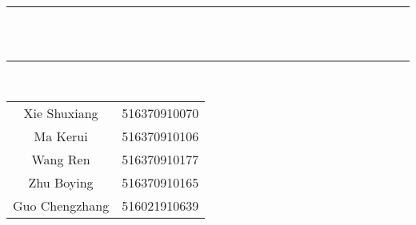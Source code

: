 \vspace*{3em}
\begin{center}
{\rule{11cm}{0.01cm} \\ \tiny~
\\ \large {}
\rule{11cm}{0.01cm}  
\vspace*{3.5em}
\\  \large{}}
\end{center}

\normalsize
\vspace*{10em}
\begin{center}
\begin{tabular}{cl}
\large
\vspace{0.3em} Xie Shuxiang&516370910070\vspace{0.3em}\\ 
\large
Ma Kerui\vspace{0.3em} &516370910106 \vspace{0.3em}\\ 
\large
Wang Ren\vspace{0.3em} &516370910177 \vspace{0.3em}\\ 
\large
Zhu Boying\vspace{0.3em} &516370910165 \vspace{0.3em}\\ 
\large
Guo Chengzhang\vspace{0.3em} &516021910639 \vspace{0.3em}\\ 
 
\end{tabular}
\end{center}

